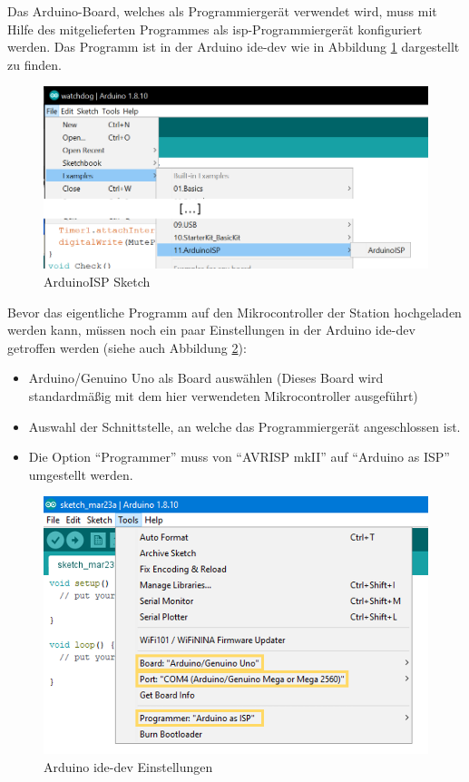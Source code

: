 Das Arduino-Board, welches als Programmiergerät verwendet wird, muss mit Hilfe des mitgelieferten Programmes als \ac{isp}-Programmiergerät konfiguriert werden. Das Programm ist in der Arduino \ac{ide-dev} wie in Abbildung \ref{fig:arduino-isp-sketch} dargestellt zu finden.
\begin{figure}[htbp!]
    \centering
    \includegraphics[width=.9\linewidth]{images/hardware-programmierung/arduino-isp-sketch.png}
    \caption{ArduinoISP Sketch}
    \label{fig:arduino-isp-sketch}
\end{figure}

Bevor das eigentliche Programm auf den Mikrocontroller der Station hochgeladen werden kann, müssen noch ein paar Einstellungen in der Arduino \ac{ide-dev} getroffen werden (siehe auch Abbildung \ref{fig:arduino-options}):
\begin{itemize}
    \item Arduino/Genuino Uno als Board auswählen (Dieses Board wird standardmäßig mit dem hier verwendeten Mikrocontroller ausgeführt)
    \item Auswahl der Schnittstelle, an welche das Programmiergerät angeschlossen ist.
    \item Die Option \enquote{Programmer} muss von \enquote{AVRISP mkII} auf \enquote{Arduino as ISP} umgestellt werden.
\end{itemize}
\begin{figure}[htbp!]
    \centering
    \includegraphics[width=.9\linewidth]{images/hardware-programmierung/optionen.png}
    \caption{Arduino \ac{ide-dev} Einstellungen}
    \label{fig:arduino-options}
\end{figure}

